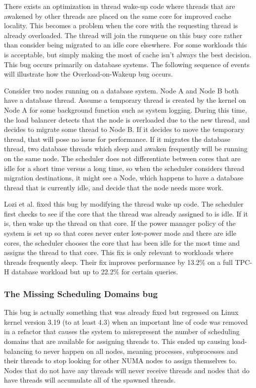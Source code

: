 \documentclass{sig-alternate}
\begin{document}
There exists an optimization in thread wake-up code where threads that are awakened by other threads are placed on the same core for improved cache locality. This becomes a problem when the core with the requesting thread is already overloaded. The thread will join the runqueue on this busy core rather than consider being migrated to an idle core elsewhere. For some workloads this is acceptable, but simply making the most of cache isn't always the best decision. This bug occurs primarily on database systems. The following sequence of events will illustrate how the Overload-on-Wakeup bug occurs.~\cite{Lozi:2016}

Consider two nodes running on a database system. Node A and Node B both have a database thread. Assume a temporary thread is created by the kernel on Node A for some background function such as system logging. During this time, the load balancer detects that the node is overloaded due to the new thread, and decides to migrate some thread to Node B. If it decides to move the temporary thread, that will pose no issue for performance. If it migrates the database thread, two database threads which sleep and awaken frequently will be running on the same node. The scheduler does not differentiate between cores that are idle for a short time versus a long time, so when the scheduler considers thread migration destinations, it might see a Node, which happens to have a database thread that is currently idle, and decide that the node needs more work.~\cite{Lozi:2016}

Lozi et al. fixed this bug by modifying the thread wake up code. The scheduler first checks to see if the core that the thread was already assigned to is idle. If it is, then wake up the thread on that core. If the power manager policy of the system is set up so that cores never enter low-power mode and there are idle cores, the scheduler chooses the core that has been idle for the most time and assigns the thread to that core. This fix is only relevant to workloads where threads frequently sleep. Their fix improves performance by 13.2\% on a full TPC-H database workload but up to 22.2\% for certain queries.~\cite{Lozi:2016}

\subsubsection{The Missing Scheduling Domains bug}
\label{sec:cfsfault_missingsched}

This bug is actually something that was already fixed but regressed on Linux kernel version 3.19 (to at least 4.3) when an important line of code was removed in a refactor that causes the system to misrepresent the number of scheduling domains that are available for assigning threads to. This ended up causing load-balancing to never happen on all nodes, meaning processes, subprocesses and their threads to stop looking for other NUMA nodes to assign themselves to. Nodes that do not have any threads will never receive threads and nodes that do have threads will accumulate all of the spawned threads.
\end{document}
